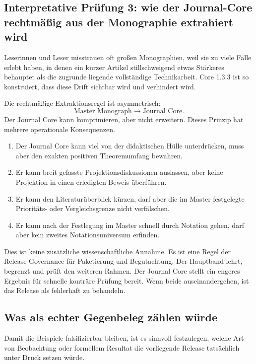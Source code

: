 \subsection{Interpretative Prüfung 3: wie der Journal-Core rechtmäßig aus der Monographie extrahiert wird}

Leserinnen und Leser misstrauen oft großen Monographien, weil sie zu viele Fälle erlebt haben, in denen ein
kurzer Artikel stillschweigend etwas Stärkeres behauptet als die zugrunde liegende vollständige
Technikarbeit. Core 1.3.3 ist so konstruiert, dass diese Drift sichtbar wird und verhindert wird.

Die rechtmäßige Extraktionsregel ist asymmetrisch:
\[
\text{Master Monograph} \longrightarrow \text{Journal Core}.
\]
Der Journal Core kann komprimieren, aber nicht erweitern. Dieses Prinzip hat mehrere operationale
Konsequenzen.

\begin{enumerate}
\item Der Journal Core kann viel von der didaktischen Hülle unterdrücken, muss aber den exakten positiven
      Theoremumfang bewahren.
\item Er kann breit gefasste Projektionsdiskussionen auslassen, aber keine Projektion in einen erledigten
      Beweis überführen.
\item Er kann den Literaturüberblick kürzen, darf aber die im Master festgelegte Prioritäts- oder
      Vergleichsgrenze nicht verfälschen.
\item Er kann nach der Festlegung im Master schnell durch Notation gehen, darf aber kein zweites
      Notationsuniversum erfinden.
\end{enumerate}

Dies ist keine zusätzliche wissenschaftliche Annahme. Es ist eine Regel der Release-Governance für Paketierung
und Begutachtung. Der Hauptband lehrt, begrenzt und prüft den weiteren Rahmen. Der Journal Core stellt ein
engeres Ergebnis für schnelle konträre Prüfung bereit. Wenn beide auseinandergehen, ist das Release als
fehlerhaft zu behandeln.

\subsection{Was als echter Gegenbeleg zählen würde}

Damit die Beispiele falsifizierbar bleiben, ist es sinnvoll festzulegen, welche Art von Beobachtung oder
formellem Resultat die vorliegende Release tatsächlich unter Druck setzen würde.


